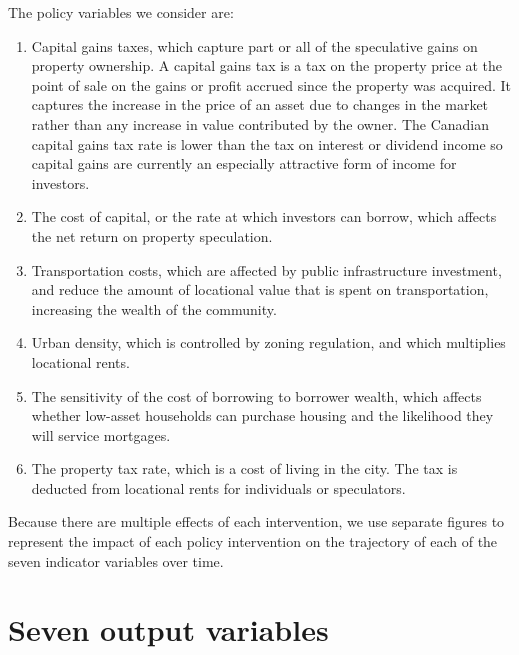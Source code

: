 The policy variables we consider are: 
\begin{enumerate}
\item Capital gains taxes, which capture part or all of the speculative gains on property ownership.  A \gls{capital gains tax}  is a tax on the property price at the point of sale on the gains or profit accrued since the property was acquired. It captures the increase in the price of an asset due to changes in the market rather than any increase in value contributed by the owner. The Canadian capital gains tax rate is lower than the tax on interest or dividend income so capital gains are currently an especially attractive form of income for investors.
\item The cost of capital, or the rate at which investors can borrow, which affects the net return on property speculation.
\item Transportation costs, which are affected by public infrastructure investment, and reduce the amount of locational value that is spent on transportation, increasing the wealth of the community. 
\item Urban density, which is controlled by zoning regulation, and which multiplies locational rents. 
\item The sensitivity of the cost of borrowing to borrower wealth, which affects whether low-asset households can purchase housing and the likelihood they will service mortgages.
\item The property tax rate, which is a cost of living in the city. The tax is deducted from locational rents for individuals or speculators.
\end{enumerate}


Because there are multiple effects of each intervention, we use separate figures to represent the impact of each policy intervention on the trajectory of each of the seven indicator variables over time. %

\section{Seven output variables}

